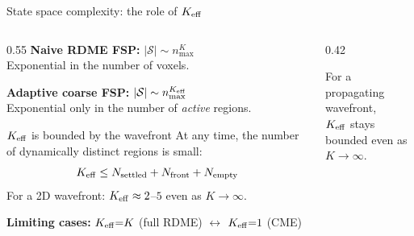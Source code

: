 \documentclass[10pt,aspectratio=169]{beamer}
\begin{document}
\begin{frame}{State space complexity: the role of $K_{\rm eff}$}

\begin{columns}[T]
\begin{column}{0.55\textwidth}
  \textbf{Naive RDME FSP:} $|\mathcal{S}| \sim n_{\max}^K$ \\
  Exponential in the number of voxels.

  \bigskip
  \textbf{Adaptive coarse FSP:} $|\mathcal{S}| \sim n_{\max}^{K_{\rm eff}}$ \\
  Exponential only in the number of \emph{active} regions.

  \bigskip
  \begin{block}{$K_{\rm eff}$ is bounded by the wavefront}
    At any time, the number of dynamically distinct
    regions is small:
    \[
      K_{\rm eff} \le N_{\rm settled} + N_{\rm front} + N_{\rm empty}
    \]
    For a 2D wavefront: $K_{\rm eff} \approx 2$--$5$ even as $K \to \infty$.
  \end{block}

  \medskip
  \textbf{Limiting cases:} $K_{\rm eff}{=}K$ (full RDME) \;$\leftrightarrow$\; $K_{\rm eff}{=}1$ (CME)
\end{column}
\begin{column}{0.42\textwidth}
  \centering

  \medskip
  {\small For a propagating wavefront,\\
   $K_{\rm eff}$ stays bounded even as\\
   $K \to \infty$.}
\end{column}
\end{columns}
\end{frame}
\end{document}
